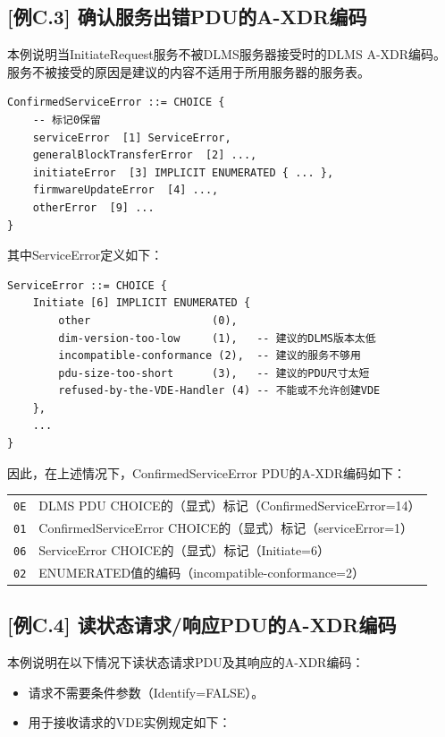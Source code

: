 \documentclass[a4paper,11pt]{ctexart}
\begin{document}
\subsection{[例C.3] 确认服务出错PDU的A-XDR编码}

本例说明当InitiateRequest服务不被DLMS服务器接受时的DLMS A-XDR编码。服务不被接受的原因是建议的内容不适用于所用服务器的服务表。

\begin{verbatim}
ConfirmedServiceError ::= CHOICE {
    -- 标记0保留
    serviceError  [1] ServiceError,
    generalBlockTransferError  [2] ...,
    initiateError  [3] IMPLICIT ENUMERATED { ... },
    firmwareUpdateError  [4] ...,
    otherError  [9] ...
}
\end{verbatim}

\noindent 其中ServiceError定义如下：
\begin{verbatim}
ServiceError ::= CHOICE {
    Initiate [6] IMPLICIT ENUMERATED {
        other                   (0),
        dim-version-too-low     (1),   -- 建议的DLMS版本太低
        incompatible-conformance (2),  -- 建议的服务不够用
        pdu-size-too-short      (3),   -- 建议的PDU尺寸太短
        refused-by-the-VDE-Handler (4) -- 不能或不允许创建VDE
    },
    ...
}
\end{verbatim}

\noindent 因此，在上述情况下，ConfirmedServiceError PDU的A-XDR编码如下：

\begin{center}
\begin{tabular}{ll}
\texttt{0E} & DLMS PDU CHOICE的（显式）标记（ConfirmedServiceError=14）\\
\texttt{01} & ConfirmedServiceError CHOICE的（显式）标记（serviceError=1）\\
\texttt{06} & ServiceError CHOICE的（显式）标记（Initiate=6）\\
\texttt{02} & ENUMERATED值的编码（incompatible-conformance=2）\\
\end{tabular}
\end{center}

\subsection{[例C.4] 读状态请求/响应PDU的A-XDR编码}

本例说明在以下情况下读状态请求PDU及其响应的A-XDR编码：
\begin{itemize}
\item 请求不需要条件参数（Identify=FALSE）。
\item 用于接收请求的VDE实例规定如下：
\end{itemize}
\end{document}
